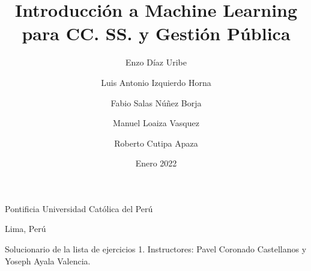 \title{Introducci\'on a Machine Learning para CC. SS. y Gesti\'on P\'ublica}
\author{
  Enzo D\'iaz Uribe \\
  \and
  Luis Antonio Izquierdo Horna \\
  \and
  Fabio Salas N\'u\~nez Borja \\
  \and
  Manuel Loaiza Vasquez \\
  \and
  Roberto Cutipa Apaza \\
  }
\date{Enero 2022}



\maketitle

\vspace*{-0.25in}
\centerline{Pontificia Universidad Cat\'olica del Per\'u}
\centerline{Lima, Per\'u}
\vspace*{0.15in}

\begin{framed}
  Solucionario de la lista de ejercicios 1.
  Instructores: Pavel Coronado Castellanos y Yoseph Ayala Valencia.
\end{framed}













